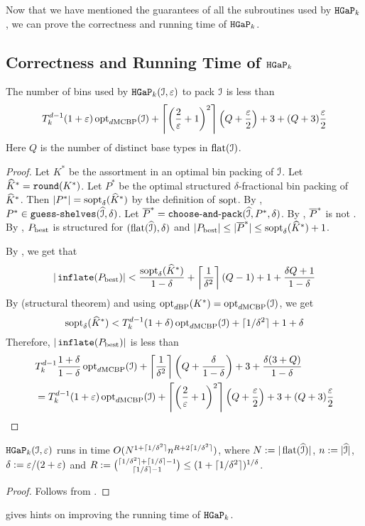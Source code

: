 Now that we have mentioned the guarantees of all the subroutines used by $\operatorname{\mathtt{HGaP}}_k$,
we can prove the correctness and running time of $\operatorname{\mathtt{HGaP}}_k$.

\subsection{Correctness and Running Time of \texorpdfstring{$\operatorname{\mathtt{HGaP}}_k$}{HGaP}}

\begin{theorem}
\label{thm:hgap:hgap}
The number of bins used by $\operatorname{\mathtt{HGaP}}_k(\mathcal{I}, \varepsilon)$ to pack $\mathcal{I}$ is less than
\[ T_k^{d-1}(1+\varepsilon)\operatorname{opt}_{d\mathrm{MCBP}}(\mathcal{I})
    + \left\lceil \left(\frac{2}{\varepsilon}+1\right)^2 \right\rceil\left(Q + \frac{\varepsilon}{2}\right)
    + 3 + (Q+3)\frac{\varepsilon}{2} \]
Here $Q$ is the number of distinct base types in $\operatorname{flat}(\mathcal{I})$.
\end{theorem}
\begin{proof}
Let $K^*$ be the assortment in an optimal bin packing of $\mathcal{I}$.
Let $\widehat{K}^* = \operatorname{\mathtt{round}}(K^*)$.
Let $P^*$ be the optimal structured $\delta$-fractional bin packing of $\widehat{K}^*$.
Then $|P^*| = \operatorname{sopt}_{\delta}(\widehat{K}^*)$ by the definition of $\operatorname{sopt}$.
By , $P^* \in \operatorname{\mathtt{guess-shelves}}(\widehat{\mathcal{I}}, \delta)$.
Let $\overline{P}^* = \operatorname{\mathtt{choose-and-pack}}(\widehat{\mathcal{I}}, P^*, \delta)$.
By , $\overline{P}^*$ is not \Null{}.
By , $P_{\mathrm{best}}$ is
structured for $(\operatorname{flat}(\widehat{\mathcal{I}}), \delta)$
and $|P_{\mathrm{best}}| \le |\overline{P}^*| \le \operatorname{sopt}_{\delta}(\widehat{K}^*) + 1$.

By , we get that
\[ |\operatorname{\mathtt{inflate}}(P_{\mathrm{best}})| < \frac{\operatorname{sopt}_{\delta}(\widehat{K}^*)}{1-\delta}
    + \left\lceil \frac{1}{\delta^2} \right\rceil(Q-1) + 1 + \frac{\delta Q + 1}{1-\delta} \]
By  (structural theorem)
and using $\operatorname{opt}_{d\mathrm{BP}}(K^*) = \operatorname{opt}_{d\mathrm{MCBP}}(\mathcal{I})$, we get
\[ \operatorname{sopt}_{\delta}(\widehat{K}^*) < T_k^{d-1}(1+\delta)\operatorname{opt}_{d\mathrm{MCBP}}(\mathcal{I}) + \lceil 1/\delta^2 \rceil + 1 + \delta \]
Therefore, $|\operatorname{\mathtt{inflate}}(P_{\mathrm{best}})|$ is less than
\begin{align*}
&T_k^{d-1}\frac{1+\delta}{1-\delta}\operatorname{opt}_{d\mathrm{MCBP}}(\mathcal{I})
    + \left\lceil \frac{1}{\delta^2} \right\rceil\left(Q + \frac{\delta}{1-\delta}\right)
    + 3 + \frac{\delta(3+Q)}{1-\delta}
\\ &= T_k^{d-1}(1+\varepsilon)\operatorname{opt}_{d\mathrm{MCBP}}(\mathcal{I})
    + \left\lceil \left(\frac{2}{\varepsilon}+1\right)^2 \right\rceil\left(Q + \frac{\varepsilon}{2}\right)
    + 3 + (Q+3)\frac{\varepsilon}{2}
\qedhere \end{align*}
\end{proof}
\begin{theorem}
\label{thm:hgap:hgap-time}
$\operatorname{\mathtt{HGaP}}_k(\mathcal{I}, \varepsilon)$ runs in time $O(N^{1+\lceil 1/\delta^2 \rceil}n^{R+2\lceil 1/\delta^2 \rceil})$, where
$N := |\operatorname{flat}(\widehat{\mathcal{I}})|$, $n := |\widehat{\mathcal{I}}|$, $\delta := \varepsilon/(2+\varepsilon)$
and $R := \binom{\lceil 1/\delta^2 \rceil + \left\lceil 1/\delta \right\rceil-1}{\left\lceil 1/\delta \right\rceil-1}
\le (1+\lceil 1/\delta^2 \rceil)^{1/\delta}$.
\end{theorem}
\begin{proof}
Follows from .
\end{proof}
 gives hints on improving the running time of $\operatorname{\mathtt{HGaP}}_k$.
